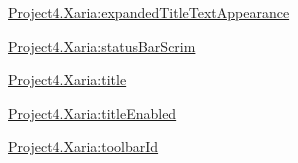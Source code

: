 {\ttfamily \hyperlink{classproject4_1_1xaria_1_1R_1_1styleable_ac2f467b39d5a7471793b18c31578d5a8}{Project4.\+Xaria\+:expanded\+Title\+Text\+Appearance}}

{\ttfamily \hyperlink{classproject4_1_1xaria_1_1R_1_1styleable_ab62e197d13af2c0b8dee73ebe8c76191}{Project4.\+Xaria\+:status\+Bar\+Scrim}}

{\ttfamily \hyperlink{classproject4_1_1xaria_1_1R_1_1styleable_a16736e7389574011ed56270a9c883976}{Project4.\+Xaria\+:title}}

{\ttfamily \hyperlink{classproject4_1_1xaria_1_1R_1_1styleable_a936dff2d19d66a8cbd916542670a8ce1}{Project4.\+Xaria\+:title\+Enabled}}

{\ttfamily \hyperlink{classproject4_1_1xaria_1_1R_1_1styleable_a0a1865ab13f923df3c8b09029e0f7e01}{Project4.\+Xaria\+:toolbar\+Id}}


